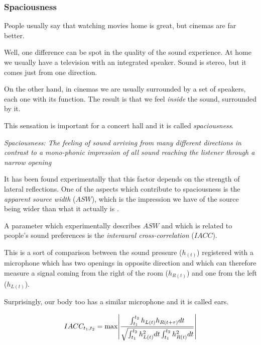 \documentclass[a4paper]{article}
\DeclarePairedDelimiter\abs{\lvert}{\rvert}%
\begin{document}
\subsubsection*{Spaciousness}

People usually say that watching movies home is great, but cinemas are far better.

Well, one difference can be spot in the quality of the sound experience. At home we usually have a television with an integrated speaker. Sound is stereo, but it comes just from one direction.

On the other hand, in cinemas we are usually surrounded by a set of speakers, each one with its function. The result is that we feel \textit{inside} the sound, surrounded by it.

This sensation is important for a concert hall and it is called \textit{spaciousness}.\\


\begin{tcolorbox}
\textit{Spaciousness: The feeling of sound arriving from many different directions in contrast to a mono-phonic impression of all sound reaching the listener through a narrow opening \cite{book:acoustic}}
\end{tcolorbox}\par\bigskip

It has been found experimentally that this factor depends on the strength of lateral reflections. One of the aspects which contribute to spaciousness is the \textit{apparent source width} ($ASW$), which is the impression we have of the source being wider than what it actually is \cite{book:acoustic}.

A parameter which experimentally describes $ASW$ and which is related to people's sound preferences is the \textit{interaural cross-correlation} ($IACC$).

This is a sort of comparison between the sound pressure ($h_{(t)}$) registered with a microphone which has two openings in opposite direction and which can therefore measure a signal coming from the right of the room ($h_{R(t)}$) and one from the left ($h_{L(t)}$).

Surprisingly, our body too has a similar microphone and it is called ears.

\begin{equation}\label{eq:iacc}
IACC_{t_1, t_2} = \mathrm{max}\abs*{\frac{\int_{t_1}^{t_2}{h_{L(t)}h_{R(t+\tau)}dt}}{\sqrt{\int_{t_1}^{t_2}{h^2_{L(t)}dt \int_{t_1}^{t_2}{h^2_{R(t)}dt}}}}}
\end{equation}
\end{document}
